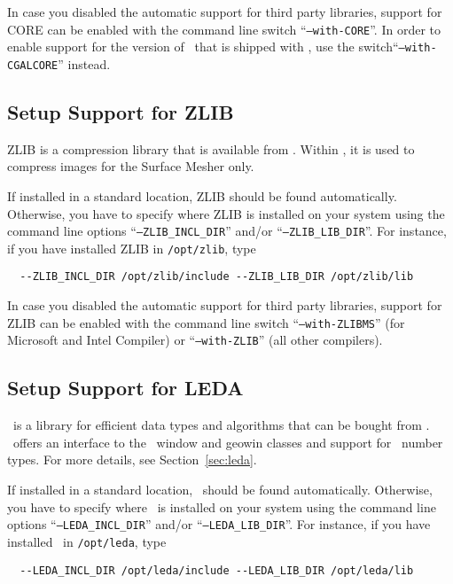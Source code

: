 In case you disabled the automatic support for third party libraries,
support for CORE can be enabled with the command line switch
``\texttt{--with-CORE}''. In order to enable support for the version
of \core\ that is shipped with \cgal, use the
switch``\texttt{--with-CGALCORE}'' instead.

\subsection{Setup Support for ZLIB\label{sec:zlib-setup}}

ZLIB is a compression library that is available from \zlibpage.
Within \cgal, it is used to compress images for the Surface Mesher
only.

If installed in a standard location, ZLIB should be found
automatically.  Otherwise, you have to specify where ZLIB is installed
on your system using the command line options
``\texttt{--ZLIB\_INCL\_DIR}'' and/or ``\texttt{--ZLIB\_LIB\_DIR}''.
For instance, if you have installed ZLIB in \texttt{/opt/zlib}, type
\begin{verbatim}
  --ZLIB_INCL_DIR /opt/zlib/include --ZLIB_LIB_DIR /opt/zlib/lib
\end{verbatim}

In case you disabled the automatic support for third party libraries,
support for ZLIB can be enabled with the command line switch
``\texttt{--with-ZLIBMS}'' (for Microsoft and Intel Compiler) or
``\texttt{--with-ZLIB}'' (all other compilers).

\subsection{Setup Support for LEDA\label{sec:leda-setup}}

\leda\ is a library for efficient data types and algorithms that can
be bought from \ledapage. \cgal\ offers an interface to the \leda\
window and geowin classes and support for \leda\ number types. For
more details, see Section~\ref{sec:leda}.

If installed in a standard location, \leda\ should be found
automatically. Otherwise, you have to specify where \leda\ is
installed on your system using the command line options
``\texttt{--LEDA\_INCL\_DIR}'' and/or ``\texttt{--LEDA\_LIB\_DIR}''.
For instance, if you have installed \leda\ in \texttt{/opt/leda}, type
\begin{verbatim}
  --LEDA_INCL_DIR /opt/leda/include --LEDA_LIB_DIR /opt/leda/lib
\end{verbatim}

